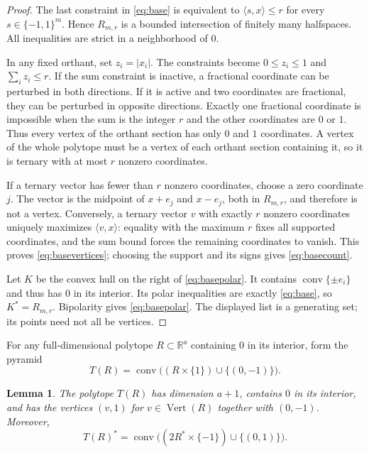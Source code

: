 \documentclass[11pt]{article}
\newtheorem{lemma}[theorem]{Lemma}
\newcommand{\conv}{\operatorname{conv}}
\newcommand{\vertices}{\operatorname{Vert}}
\begin{document}
\begin{proof}
The last constraint in \eqref{eq:base} is equivalent to
$\langle s,x\rangle\leq r$ for every $s\in\{-1,1\}^m$.
Hence $R_{m,r}$ is a bounded intersection of finitely many halfspaces.
All inequalities are strict in a neighborhood of $0$.

In any fixed orthant, set $z_i=|x_i|$. The constraints become
$0\leq z_i\leq1$ and $\sum_i z_i\leq r$.
If the sum constraint is inactive, a fractional coordinate can be perturbed
in both directions. If it is active and two coordinates are fractional,
they can be perturbed in opposite directions. Exactly one fractional
coordinate is impossible when the sum is the integer $r$ and the other
coordinates are $0$ or $1$. Thus every vertex of the orthant section has
only $0$ and $1$ coordinates. A vertex of the whole polytope must be a
vertex of each orthant section containing it, so it is ternary with at most
$r$ nonzero coordinates.

If a ternary vector has fewer than $r$ nonzero coordinates, choose a zero
coordinate $j$. The vector is the midpoint of $x+e_j$ and $x-e_j$, both
in $R_{m,r}$, and therefore is not a vertex. Conversely, a ternary vector
$v$ with exactly $r$ nonzero coordinates uniquely maximizes
$\langle v,x\rangle$: equality with the maximum $r$ fixes all supported
coordinates, and the sum bound forces the remaining coordinates to vanish.
This proves \eqref{eq:basevertices}; choosing the support and its signs
gives \eqref{eq:basecount}.

Let $K$ be the convex hull on the right of \eqref{eq:basepolar}.
It contains $\conv\{\pm e_i\}$ and thus has $0$ in its interior.
Its polar inequalities are exactly \eqref{eq:base}, so $K^*=R_{m,r}$.
Bipolarity gives \eqref{eq:basepolar}. The displayed list is a generating
set; its points need not all be vertices.
\end{proof}

For any full-dimensional polytope $R\subset\mathbb R^a$ containing $0$ in
its interior, form the pyramid
\begin{equation}\label{eq:pyramid}
 T(R)=\conv\big((R\times\{1\})\cup\{(0,-1)\}\big).
\end{equation}

\begin{lemma}\label{lem:pyramid}
The polytope $T(R)$ has dimension $a+1$, contains $0$ in its interior,
and has the vertices $(v,1)$ for $v\in\vertices(R)$ together with $(0,-1)$.
Moreover,
\begin{equation}\label{eq:pyramidpolar}
 T(R)^*=\conv\big((2R^*\times\{-1\})\cup\{(0,1)\}\big).
\end{equation}
\end{lemma}
\end{document}
